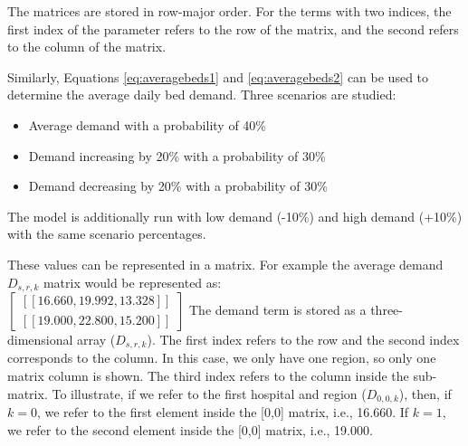\documentclass[../thesis.tex]{subfiles}
\begin{document}
The matrices are stored in row-major order. For the terms with two indices, the first index of the parameter refers to the row of the matrix, and the second refers to the column of the matrix.

Similarly, Equations \eqref{eq:averagebeds1} and \eqref{eq:averagebeds2} can be used to determine the average daily bed demand. Three scenarios are studied:

\begin{itemize}
    \item Average demand with a probability of 40\%
    \item Demand increasing by 20\% with a probability of 30\% 
    \item Demand decreasing by 20\% with a probability of 30\%
\end{itemize}

The model is additionally run with low demand (-10\%) and high demand (+10\%) with the same scenario percentages.
\begin{table}[h!]
    \centering{}
    \caption{The daily bed demand figures for each region and specialty $D_{s,r,k}$, categorised by low, average and high.}
    \label{tab:WEStochDemands}
\end{table}
These values can be represented in a matrix. For example the average demand $D_{s,r,k}$ matrix would be represented as:\\
\centering
$\begin{bmatrix}
   [[16.660, 19.992, 13.328]] \\
    [[19.000, 22.800, 15.200]]
\end{bmatrix}$
\flushleft
The demand term is stored as a three-dimensional array ($D_{s,r,k}$). The first index refers to the row and the second index corresponds to the column. In this case, we only have one region, so only one matrix column is shown. The third index refers to the column inside the sub-matrix. To illustrate, if we refer to the first hospital and region ($D_{0,0,k}$), then, if $k=0$, we refer to the first element inside the [0,0] matrix, i.e., 16.660. If $k=1$, we refer to the second element inside the [0,0] matrix, i.e., 19.000.
\end{document}
